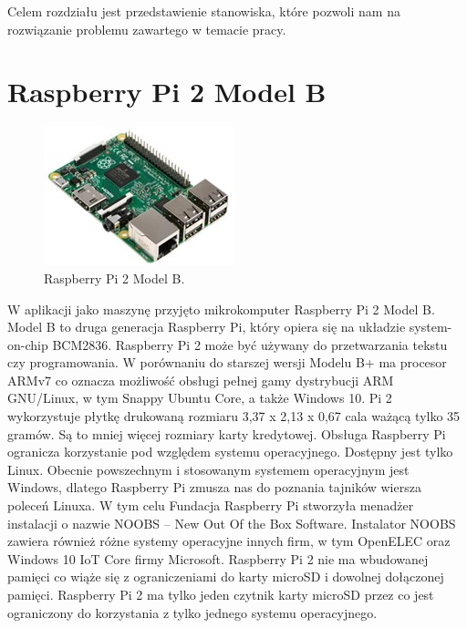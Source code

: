 Celem rozdziału jest przedstawienie stanowiska, które pozwoli nam na rozwiązanie problemu zawartego w temacie pracy.
\section{Raspberry Pi 2 Model B} 
\begin{figure}
	\centering
	\includegraphics[width=0.5\linewidth]{"obrazy/Raspberry Pi"}
	\caption{Raspberry Pi 2 Model B.}
	\label{fig:1}
\end{figure}
W aplikacji jako maszynę przyjęto mikrokomputer Raspberry Pi 2 Model B. Model B to druga generacja Raspberry Pi, który opiera się na układzie system-on-chip BCM2836. Raspberry Pi 2 może być używany do przetwarzania tekstu czy programowania. W porównaniu do starszej wersji Modelu B+ ma procesor ARMv7 co oznacza możliwość obsługi pełnej gamy dystrybucji ARM GNU/Linux,  w tym Snappy Ubuntu Core, a także Windows 10. Pi 2 wykorzystuje płytkę drukowaną rozmiaru 3,37 x 2,13 x 0,67 cala ważącą tylko 35 gramów. Są to mniej więcej rozmiary karty kredytowej.
Obsługa Raspberry Pi ogranicza korzystanie pod względem systemu operacyjnego. Dostępny jest tylko Linux. Obecnie powszechnym i stosowanym systemem operacyjnym jest Windows, dlatego Raspberry Pi zmusza nas do poznania tajników wiersza poleceń Linuxa. W tym celu Fundacja Raspberry Pi stworzyła menadżer instalacji o nazwie NOOBS – New Out Of the Box Software. Instalator NOOBS zawiera również różne systemy operacyjne innych firm, w tym OpenELEC oraz Windows 10 IoT Core firmy Microsoft. Raspberry Pi 2 nie ma wbudowanej pamięci co wiąże się z ograniczeniami do karty microSD i dowolnej dołączonej pamięci. Raspberry Pi 2 ma tylko jeden czytnik karty microSD przez co jest ograniczony do korzystania z tylko jednego systemu operacyjnego.

